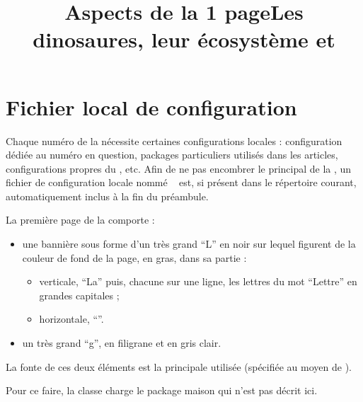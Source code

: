 \documentclass{letgut}
\begin{document}
\begin{ltx-code-result}[title addon=boîtes d'alertes]
\end{ltx-code-result}

\section{Fichier local de configuration}
\label{sec:fichier-local-de}

Chaque numéro de la  nécessite certaines configurations locales :
configuration dédiée au numéro en question, packages particuliers utilisés dans
les articles, configurations propres du , etc. Afin de ne pas
encombrer le  principal de la , un fichier de configuration
locale nommé
%
\ExplSyntaxOn
{}~
\ExplSyntaxOff
%
est, si présent dans le répertoire courant, automatiquement inclus à la fin
du préambule.

\title{Aspects de la 1\iere{} page}
\label{sec:mise-en-page}

La première page de la  comporte :
\begin{itemize}
\item une bannière sous forme d'un très grand \enquote{L} en noir sur lequel
  figurent de la couleur de fond de la page, en gras, dans sa partie :
  \begin{itemize}
  \item verticale, \enquote{La} puis, chacune sur une ligne, les lettres du mot
    \enquote{Lettre} en grandes capitales ;
  \item horizontale, \enquote{\gut}.
  \end{itemize}
\item un très grand \enquote{g}, en filigrane et en gris clair.
\end{itemize}
La fonte de ces deux éléments est la principale utilisée (spécifiée au moyen de
).

Pour ce faire, la classe charge le package maison  qui
n'est pas décrit ici.

\title{Les dinosaures, leur écosystème et }
\label{recours-docker}
\end{document}
